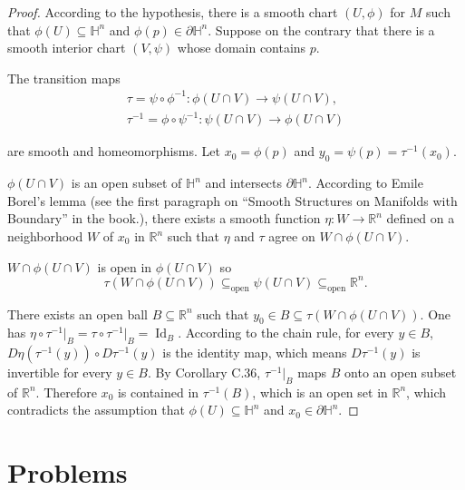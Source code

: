 \begin{proof}
    According to the hypothesis, there is a smooth chart \( (U, \phi) \) for \( M \) such that \( \phi(U) \subseteq \mathbb{H}^{n} \) and \( \phi(p) \in \partial \mathbb{H}^{n} \). Suppose on the contrary that there is a smooth interior chart \( (V, \psi) \) whose domain contains \( p \).

    The transition maps
    \begingroup
    \allowdisplaybreaks%
    \begin{align*}
        \tau = \psi \circ \phi^{-1}: \phi(U \cap V) \to \psi(U \cap V), \\
        \tau^{-1} = \phi \circ \psi^{-1}: \psi(U \cap V) \to \phi(U \cap V)
    \end{align*}
    \endgroup

    are smooth and homeomorphisms. Let \( x_{0} = \phi(p) \) and \( y_{0} = \psi(p) = \tau^{-1}(x_{0}) \).

    \( \phi(U \cap V) \) is an open subset of \( \mathbb{H}^{n} \) and intersects \( \partial \mathbb{H}^{n} \). According to Emile Borel's lemma (see the first paragraph on ``Smooth Structures on Manifolds with Boundary'' in the book.), there exists a smooth function \( \eta: W \to \mathbb{R}^{n} \) defined on a neighborhood \( W \) of \( x_{0} \) in \( \mathbb{R}^{n} \) such that \( \eta \) and \( \tau \) agree on \( W \cap \phi(U \cap V) \).

    \( W \cap \phi(U \cap V) \) is open in \( \phi(U \cap V) \) so
    \[
        \tau(W \cap \phi(U \cap V)) \subseteq_{\text{open}} \psi(U \cap V) \subseteq_{\text{open}} \mathbb{R}^{n}.
    \]

    There exists an open ball \( B \subseteq \mathbb{R}^{n} \) such that \( y_{0} \in B \subseteq \tau(W \cap \phi(U \cap V)) \). One has \( \eta \circ \tau^{-1}\vert_{B} = \tau \circ \tau^{-1}\vert_{B} = \operatorname{Id}_{B} \). According to the chain rule, for every \( y \in B \), \( D \eta(\tau^{-1}(y)) \circ D\tau^{-1}(y) \) is the identity map, which means \( D\tau^{-1}(y) \) is invertible for every \( y \in B \). By Corollary C.36, \( \tau^{-1}\vert_{B} \) maps \( B \) onto an open subset of \( \mathbb{R}^{n} \). Therefore \( x_{0} \) is contained in \( \tau^{-1}(B) \), which is an open set in \( \mathbb{R}^{n} \), which contradicts the assumption that \( \phi(U) \subseteq \mathbb{H}^{n} \) and \( x_{0} \in \partial \mathbb{H}^{n} \).
\end{proof}

\section{Problems}

